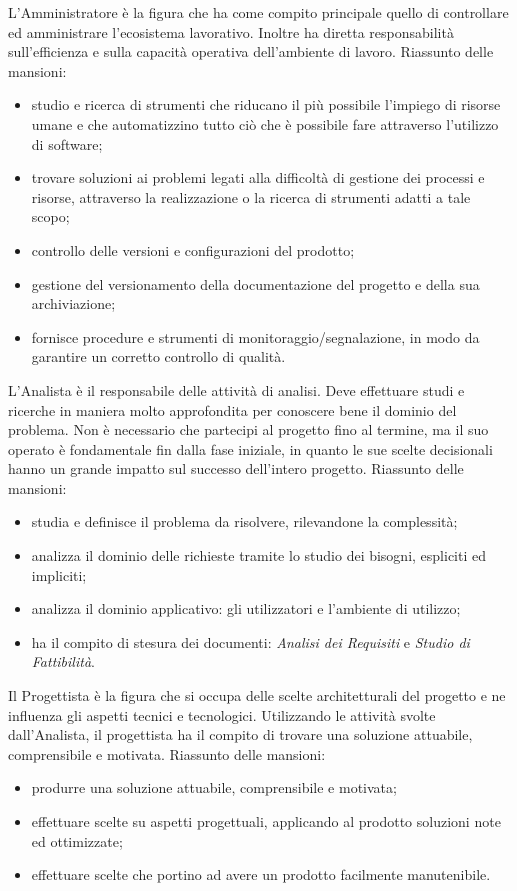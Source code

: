 			L'Amministratore è la figura che ha come compito principale quello di controllare ed amministrare l'ecosistema lavorativo. Inoltre ha diretta responsabilità sull'efficienza e sulla capacità operativa dell'ambiente di lavoro.
			Riassunto delle mansioni:
			\begin{itemize}
				\item studio e ricerca di strumenti che riducano il più possibile l'impiego di risorse umane e che automatizzino tutto ciò che è possibile fare attraverso l'utilizzo di software;
				\item trovare soluzioni ai problemi legati alla difficoltà di gestione dei processi e risorse, attraverso la realizzazione o la ricerca di strumenti adatti a tale scopo;
				\item controllo delle versioni e configurazioni del prodotto;
				\item gestione del versionamento della documentazione del progetto e della sua archiviazione;
				\item fornisce procedure e strumenti di monitoraggio/segnalazione, in modo da garantire un corretto controllo di qualità.
			\end{itemize}
		
			L'Analista è il responsabile delle attività di analisi. Deve effettuare studi e ricerche in maniera molto approfondita per conoscere bene il dominio del problema. Non è necessario che partecipi al progetto fino al termine, ma il suo operato è fondamentale fin dalla fase iniziale, in quanto le sue scelte decisionali hanno un grande impatto sul successo dell'intero progetto.
			Riassunto delle mansioni:
			\begin{itemize}
				\item studia e definisce il problema da risolvere, rilevandone la complessità;
				\item analizza il dominio delle richieste tramite lo studio dei bisogni, espliciti ed impliciti;
				\item analizza il dominio applicativo: gli utilizzatori e l'ambiente di utilizzo;
				\item ha il compito di stesura dei documenti: {\it Analisi dei Requisiti} e {\it Studio di Fattibilità}.
			\end{itemize}
		
			Il Progettista è la figura che si occupa delle scelte architetturali del progetto e ne influenza gli aspetti tecnici e tecnologici. Utilizzando le attività svolte dall'Analista, il progettista ha il compito di trovare una soluzione attuabile, comprensibile e motivata.
			Riassunto delle mansioni:
			\begin{itemize}
				\item produrre una soluzione attuabile, comprensibile e motivata;
				\item effettuare scelte su aspetti progettuali, applicando al prodotto soluzioni note ed ottimizzate;
				\item effettuare scelte che portino ad avere un prodotto facilmente manutenibile.
			\end{itemize}
		
